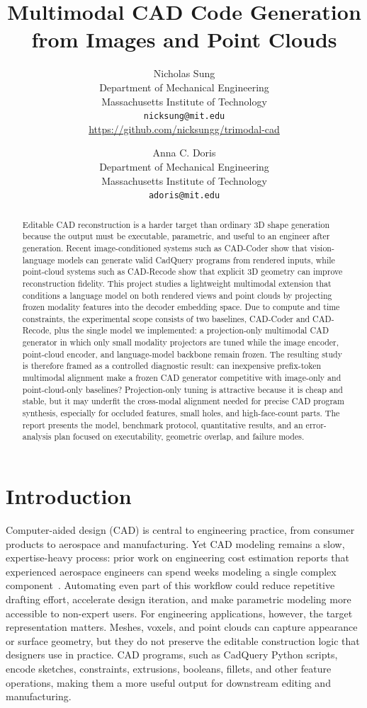 \documentclass{article}
\title{Multimodal CAD Code Generation from Images and Point Clouds}
\author{
  Nicholas Sung \\
  Department of Mechanical Engineering \\
  Massachusetts Institute of Technology \\
  \texttt{nicksung@mit.edu} \\
  \url{https://github.com/nicksungg/trimodal-cad}
  \and
  Anna C. Doris \\
  Department of Mechanical Engineering \\
  Massachusetts Institute of Technology \\
  \texttt{adoris@mit.edu}
}
\begin{document}
\maketitle

\begin{abstract}
Editable CAD reconstruction is a harder target than ordinary 3D shape generation because the output must be executable, parametric, and useful to an engineer after generation. Recent image-conditioned systems such as CAD-Coder show that vision-language models can generate valid CadQuery programs from rendered inputs, while point-cloud systems such as CAD-Recode show that explicit 3D geometry can improve reconstruction fidelity. This project studies a lightweight multimodal extension that conditions a language model on both rendered views and point clouds by projecting frozen modality features into the decoder embedding space. Due to compute and time constraints, the experimental scope consists of two baselines, CAD-Coder and CAD-Recode, plus the single model we implemented: a projection-only multimodal CAD generator in which only small modality projectors are tuned while the image encoder, point-cloud encoder, and language-model backbone remain frozen. The resulting study is therefore framed as a controlled diagnostic result: can inexpensive prefix-token multimodal alignment make a frozen CAD generator competitive with image-only and point-cloud-only baselines? Projection-only tuning is attractive because it is cheap and stable, but it may underfit the cross-modal alignment needed for precise CAD program synthesis, especially for occluded features, small holes, and high-face-count parts. The report presents the model, benchmark protocol, quantitative results, and an error-analysis plan focused on executability, geometric overlap, and failure modes.
\end{abstract}

\section{Introduction}

Computer-aided design (CAD) is central to engineering practice, from consumer products to aerospace and manufacturing. Yet CAD modeling remains a slow, expertise-heavy process: prior work on engineering cost estimation reports that experienced aerospace engineers can spend weeks modeling a single complex component~\cite{roy2001quantitative}. Automating even part of this workflow could reduce repetitive drafting effort, accelerate design iteration, and make parametric modeling more accessible to non-expert users. For engineering applications, however, the target representation matters. Meshes, voxels, and point clouds can capture appearance or surface geometry, but they do not preserve the editable construction logic that designers use in practice. CAD programs, such as CadQuery Python scripts, encode sketches, constraints, extrusions, booleans, fillets, and other feature operations, making them a more useful output for downstream editing and manufacturing.
\end{document}
